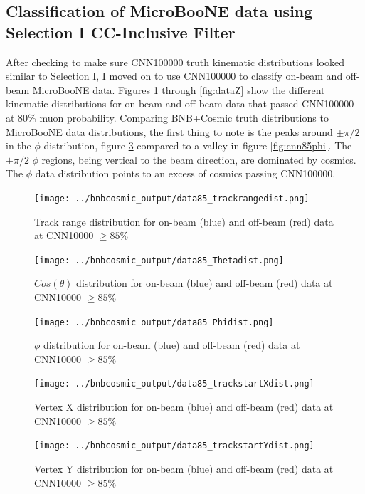 \subsection{Classification of MicroBooNE data using Selection I CC-Inclusive Filter}
After checking to make sure CNN100000 truth kinematic distributions looked similar to Selection I, I moved on to use CNN100000 to classify on-beam and off-beam MicroBooNE data. Figures \ref{fig:datatrackrange} through \ref{fig:dataZ} show the different kinematic distributions for on-beam and off-beam data that passed CNN100000 at 80\% muon probability. Comparing BNB+Cosmic truth distributions to MicroBooNE data distributions, the first thing to note is the peaks around $\pm\pi/2$ in the $\phi$ distribution, figure \ref{fig:dataphi} compared to a valley in figure \ref{fig:cnn85phi}. The $\pm\pi/2$ $\phi$ regions, being vertical to the beam direction, are dominated by cosmics. The $\phi$ data distribution points to an excess of cosmics passing CNN100000. 
\begin{figure}[htp!]
\centering
\texttt{[image: ../bnbcosmic\_output/data85\_trackrangedist.png]}
\caption{Track range distribution for on-beam (blue) and off-beam (red) data at CNN10000 $\geq 85\%$} 
\label{fig:datatrackrange}
\end{figure}

\begin{figure}[htp!]
\centering
\texttt{[image: ../bnbcosmic\_output/data85\_Thetadist.png]}
\caption{$Cos(\theta)$ distribution for on-beam (blue) and off-beam (red) data at CNN10000 $\geq 85\%$} 
\label{fig:datatheta}
\end{figure}

\begin{figure}[htp!]
\centering
\texttt{[image: ../bnbcosmic\_output/data85\_Phidist.png]}
\caption{$\phi$ distribution for on-beam (blue) and off-beam (red) data at CNN10000 $\geq 85\%$} 
\label{fig:dataphi}
\end{figure}

\begin{figure}[htp!]
\centering
\texttt{[image: ../bnbcosmic\_output/data85\_trackstartXdist.png]}
\caption{Vertex X distribution for on-beam (blue) and off-beam (red) data at CNN10000 $\geq 85\%$} 
\label{fig:dataX}
\end{figure}

\begin{figure}[htp!]
\centering
\texttt{[image: ../bnbcosmic\_output/data85\_trackstartYdist.png]}
\caption{Vertex Y distribution for on-beam (blue) and off-beam (red) data at CNN10000 $\geq 85\%$} 
\label{fig:dataY}
\end{figure}

